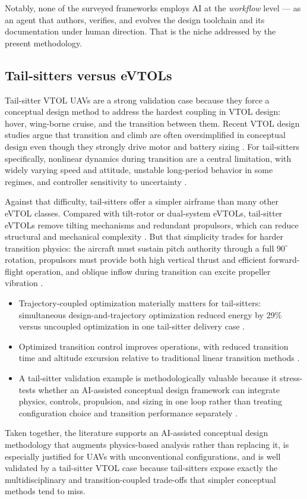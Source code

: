Notably, none of the surveyed frameworks employs AI at the
\emph{workflow} level --- as an agent that authors, verifies, and
evolves the design toolchain and its documentation under human
direction. That is the niche addressed by the present methodology.

\subsection{Tail-sitters versus eVTOLs}

Tail-sitter VTOL UAVs are a strong validation case because they force a
conceptual design method to address the hardest coupling in VTOL
design: hover, wing-borne cruise, and the transition between them.
Recent VTOL design studies argue that transition and climb are often
oversimplified in conceptual design even though they strongly drive
motor and battery sizing \citep{kaneko2024}. For tail-sitters
specifically, nonlinear dynamics during transition are a central
limitation, with widely varying speed and attitude, unstable
long-period behavior in some regimes, and controller sensitivity to
uncertainty \citep{yang2024}.

Against that difficulty, tail-sitters offer a simpler airframe than
many other eVTOL classes. Compared with tilt-rotor or dual-system
eVTOLs, tail-sitter eVTOLs remove tilting mechanisms and redundant
propulsors, which can reduce structural and mechanical complexity
\citep{yang2024}. But that simplicity trades for harder transition
physics: the aircraft must sustain pitch authority through a full
$90^{\circ}$ rotation, propulsors must provide both high vertical
thrust and efficient forward-flight operation, and oblique inflow
during transition can excite propeller vibration \citep{yang2024}.

\begin{itemize}[nosep]
\item Trajectory-coupled optimization materially matters for
  tail-sitters: simultaneous design-and-trajectory optimization reduced
  energy by 29\% versus uncoupled optimization in one tail-sitter
  delivery case \citep{kaneko2024}.
\item Optimized transition control improves operations, with reduced
  transition time and altitude excursion relative to traditional
  linear transition methods \citep{yang2024}.
\item A tail-sitter validation example is methodologically valuable
  because it stress-tests whether an AI-assisted conceptual design
  framework can integrate physics, controls, propulsion, and sizing in
  one loop rather than treating configuration choice and transition
  performance separately \citep{kaneko2024}.
\end{itemize}

Taken together, the literature supports an AI-assisted conceptual
design methodology that augments physics-based analysis rather than
replacing it, is especially justified for UAVs with unconventional
configurations, and is well validated by a tail-sitter VTOL case
because tail-sitters expose exactly the multidisciplinary and
transition-coupled trade-offs that simpler conceptual methods tend to
miss.
